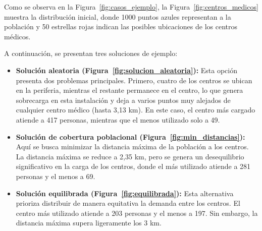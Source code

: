 \documentclass[12pt,a4paper]{book}
\begin{document}

Como se observa en la Figura~\ref{fig:casos_ejemplo}, la Figura~\ref{fig:centros_medicos} muestra la distribución inicial, donde 1000 puntos azules representan a la población y 50 estrellas rojas indican las posibles ubicaciones de los centros médicos.

A continuación, se presentan tres soluciones de ejemplo:

\begin{itemize}
    \item \textbf{Solución aleatoria (Figura~\ref{fig:solucion_aleatoria}):} Esta opción presenta dos problemas principales. Primero, cuatro de los centros se ubican en la periferia, mientras el restante permanece en el centro, lo que genera sobrecarga en esta instalación y deja a varios puntos muy alejados de cualquier centro médico (hasta 3,13 km). En este caso, el centro más cargado atiende a 417 personas, mientras que el menos utilizado solo a 49.
    \item \textbf{Solución de cobertura poblacional (Figura~\ref{fig:min_distancias}):} Aquí se busca minimizar la distancia máxima de la población a los centros. La distancia máxima se reduce a 2,35 km, pero se genera un desequilibrio significativo en la carga de los centros, donde el más utilizado atiende a 281 personas y el menos a 69.
    \item \textbf{Solución equilibrada (Figura~\ref{fig:equilibrada}):} Esta alternativa prioriza distribuir de manera equitativa la demanda entre los centros. El centro más utilizado atiende a 203 personas y el menos a 197. Sin embargo, la distancia máxima supera ligeramente los 3 km.
\end{itemize}
\end{document}
